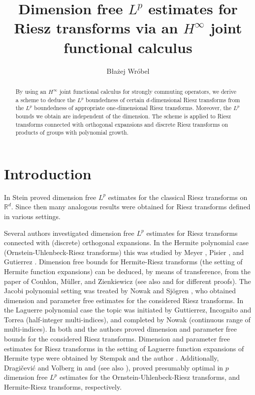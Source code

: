 \documentclass[leqno,12pt]{amsart}
\title[Riesz transforms and $H^{\infty}$ joint functional calculus]{Dimension free $L^p$ estimates for Riesz transforms via an $H^{\infty}$ joint functional calculus}
\author{B\l a\.{z}ej Wr\'obel}
\theoremstyle{definition}
\theoremstyle{remark}
\begin{document}
 \begin{abstract}

  By using an $H^{\infty}$ joint functional calculus for strongly commuting operators, we derive a scheme to deduce the $L^p$ boundedness of certain $d$-dimensional Riesz transforms from the $L^p$ boundedness of appropriate one-dimensional Riesz transforms. Moreover, the $L^p$ bounds we obtain are independent of the dimension. The scheme is applied to Riesz transforms connected with orthogonal expansions and discrete Riesz transforms on products of groups with polynomial growth.
 \end{abstract}
  \maketitle
 \section{Introduction}

        In \cite{SteinRiesz} Stein proved dimension free $L^p$ estimates for the classical Riesz transforms on $\mathbb{R}^d.$ Since then many analogous results were obtained for Riesz transforms defined in various settings.

       Several authors investigated dimension free $L^p$ estimates for Riesz transforms connected with (discrete) orthogonal expansions. In the Hermite polynomial case (Ornstein-Uhlenbeck-Riesz transforms) this was studied by Meyer \cite{Mey1}, Pisier \cite{Pis1}, and Gutierrez \cite{Gut1}. Dimension free bounds for Hermite-Riesz transforms (the setting of Hermite function expansions) can be deduced, by means of transference, from the paper of Couhlon, M\"uller, and Zienkiewicz \cite{CMZ} (see also \cite{HRST} and \cite{LP2} for different proofs). The Jacobi polynomial setting was treated by Nowak and Sj\"ogren \cite{NSj2}, who obtained dimension and parameter free estimates for the considered Riesz transforms. In the Laguerre polynomial case the topic was initiated by Guttierrez, Incognito and Torrea \cite{GIT} (half-integer multi-indices), and completed by Nowak \cite{No1} (continuous range of multi-indices). In both \cite{GIT} and \cite{No1} the authors proved dimension and parameter free bounds for the considered Riesz transforms. Dimension and parameter free estimates for Riesz transforms in the setting of Laguerre function expansions of Hermite type were obtained by Stempak and the author \cite{StWr}. Additionally, Dragi\v{c}evi\'{c} and Volberg in \cite{DragVol0} and  \cite{DragVol1} (see also \cite{DragVol2}), proved presumably optimal in $p$ dimension free $L^p$ estimates for the Ornstein-Uhlenbeck-Riesz transforms, and Hermite-Riesz transforms, respectively.
\end{document}
